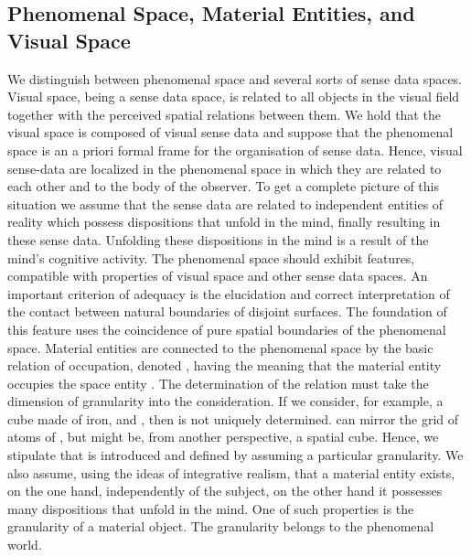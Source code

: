 \documentclass{ao2e}
\begin{document}
{\subsection{Phenomenal Space, Material Entities, and Visual Space}
We distinguish between phenomenal space and several sorts of sense data spaces. Visual space, being a sense data space,  is related to all objects in the visual field together with
the perceived spatial relations between them. We hold that the visual space is composed of visual sense data and suppose that the
phenomenal space is an a priori formal frame for the organisation of sense data.  Hence,  visual sense-data are localized in the phenomenal space in which they are related to each other and to the body of the observer. To get a complete picture of this situation we assume that the sense data are related to independent entities of reality which possess dispositions that unfold in the mind, finally resulting in these sense data. Unfolding these dispositions in the mind is a result of the mind's cognitive activity. The phenomenal space should exhibit features, compatible with properties of visual space and other sense data spaces. An important criterion of adequacy is the elucidation and correct interpretation of the contact between natural boundaries of disjoint surfaces. The foundation of this feature uses
the coincidence of pure spatial boundaries of the phenomenal space.
Material entities are connected to the phenomenal space by the basic relation of occupation, denoted , having the meaning that the material entity  occupies the space entity . The determination of the relation  must take the dimension of granularity into the consideration. If we consider, for example,  a cube  made of iron, and , then  is not uniquely determined.  can mirror the grid of atoms
of , but  might be,  from another perspective, a spatial cube. Hence, we stipulate
that  is introduced and defined by assuming a particular granularity. We also assume, using the ideas of integrative realism, that a material entity exists,  on the one hand, independently of the subject, on the other hand it possesses many dispositions that unfold in the mind. One of such properties is the granularity of a material object. The granularity belongs to the phenomenal world.

}
\end{document}
